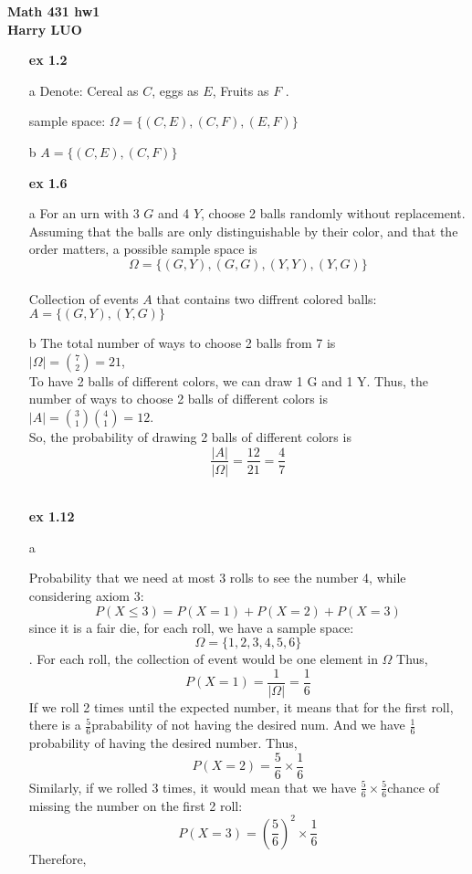 \documentclass{article}
\begin{document}
\textbf{Math 431 hw1}\\
\textbf{Harry LUO} \\
\begin{itemize}
      \item [\textbf{ex 1.2}]

      \item[a] Denote: Cereal as $C$, eggs as $E$, Fruits as $F$ .

            sample space: $\Omega = \{(C,E),(C,F), (E,F )\} $ \\

      \item[b] $A = \{(C,E),(C,F)\}$\\

      \item[\textbf{ex 1.6}]

      \item[a]For an urn with 3 $G$ and 4 $Y$, choose 2 balls randomly without replacement.\\
            Assuming that  the balls are only distinguishable by their color, and that the order matters, a possible sample space is
            $$\Omega = \{ (G,Y),(G,G),(Y,Y),(Y,G)\}$$\\
            Collection of events $A$ that contains two diffrent colored balls: $A = \{(G,Y),(Y,G)\}$ \\

      \item[b ]The total number of ways to choose 2 balls from 7 is \\$|\Omega|=\binom{7}{2} = 21$,\\
            To have 2 balls of different colors, we can draw 1 G and 1 Y. Thus, the number of ways to choose 2 balls of different colors is \\$|A|=\binom{3}{1} \binom{4}{1} = 12$.\\
            So, the probability of drawing 2 balls of different colors is $$\frac{|A|}{|\Omega|}=\frac{12}{21} = \frac{4}{7}$$\\


      \item[\textbf{ex 1.12}]
      \item[a]

            Probability that we need at most 3 rolls to see the number 4, while considering axiom 3:
            $$P(X\leq 3) = P(X=1)+P(X=2)+P(X=3)$$
            since it is a fair die, for each roll, we have a sample space:
            $$\Omega = \{1,2,3,4,5,6\}$$.
            For each roll, the collection of event would be one element in $\Omega$
            Thus,
            $$P(X=1) =\frac{1}{|\Omega|}= \frac{1}{6}$$
            If we roll 2 times until the expected number, it means that for the first roll, there is a $\frac{5}{6}$prabability of not having the desired num. And we have $\frac{1}{6}$ probability of having the desired number. Thus,
            $$P(X=2) = \frac{5}{6}\times\frac{1}{6}$$ Similarly, if we rolled 3 times, it would mean that we have $\frac{5}{6}\times \frac{5}{6}$chance of missing the number on the first 2 roll:
            $$P(X=3) = (\frac{5}{6})^2\times\frac{1}{6}$$ Therefore,


\end{itemize}
\end{document}
